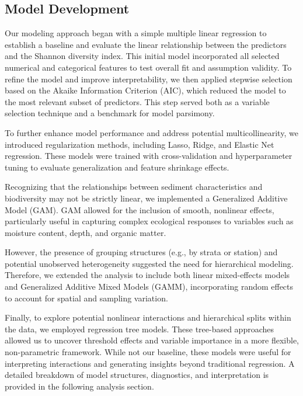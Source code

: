 \documentclass[12pt]{article}
\begin{document}
\subsection{Model Development}

\qquad Our modeling approach began with a simple multiple linear regression to establish a baseline and evaluate the linear relationship between the predictors and the Shannon diversity index. This initial model incorporated all selected numerical and categorical features to test overall fit and assumption validity. To refine the model and improve interpretability, we then applied stepwise selection based on the Akaike Information Criterion (AIC), which reduced the model to the most relevant subset of predictors. This step served both as a variable selection technique and a benchmark for model parsimony.

\qquad To further enhance model performance and address potential multicollinearity, we introduced regularization methods, including Lasso, Ridge, and Elastic Net regression. These models were trained with cross-validation and hyperparameter tuning to evaluate generalization and feature shrinkage effects.

\qquad Recognizing that the relationships between sediment characteristics and biodiversity may not be strictly linear, we implemented a Generalized Additive Model (GAM). GAM allowed for the inclusion of smooth, nonlinear effects, particularly useful in capturing complex ecological responses to variables such as moisture content, depth, and organic matter. 

\qquad However, the presence of grouping structures (e.g., by strata or station) and potential unobserved heterogeneity suggested the need for hierarchical modeling. Therefore, we extended the analysis to include both linear mixed-effects models and Generalized Additive Mixed Models (GAMM), incorporating random effects to account for spatial and sampling variation.

\qquad Finally, to explore potential nonlinear interactions and hierarchical splits within the data, we employed regression tree models. These tree-based approaches allowed us to uncover threshold effects and variable importance in a more flexible, non-parametric framework. While not our baseline, these models were useful for interpreting interactions and generating insights beyond traditional regression. A detailed breakdown of model structures, diagnostics, and interpretation is provided in the following analysis section.
\end{document}
